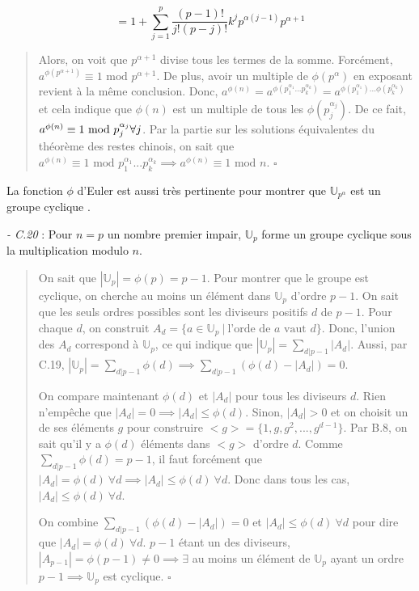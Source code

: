 \begin{equation*}
    = 1 + \sum_{j=1}^{p}\frac{(p-1)!}{j!(p-j)!}k^jp^{\alpha(j-1)}p^{\alpha + 1}
\end{equation*}

\begin{quote}
    Alors, on voit que $p^{\alpha + 1}$ divise tous les termes de la somme. Forcément, $a^{\phi(p^{\alpha + 1})} \equiv 1 \text{ mod } p^{\alpha + 1}$. De plus, avoir un multiple de $\phi(p^\alpha)$ en exposant revient à la même conclusion. Donc, $a^{\phi(n)} = a^{\phi(p_1^{\alpha_1}...p_k^{\alpha_k})} = a^{\phi(p_1^{\alpha_1})...\phi(p_k^{\alpha_k})}$ et cela indique que $\phi(n)$ est un multiple de tous les $\phi(p_j^{\alpha_j})$. De ce fait, $a^{\phi(n)} \equiv 1 \text{ mod } p_j^{\alpha_j} \\ \forall j$. Par la partie sur les solutions équivalentes du théorème des restes chinois, on sait que $a^{\phi(n)} \equiv 1 \text{ mod } p_1^{\alpha_1}...p_k^{\alpha_k} \implies a^{\phi(n)} \equiv 1 \text{ mod } n$. $\square$
\end{quote}

La fonction $\phi$ d'Euler est aussi très pertinente pour montrer que $\mathbb{U}_{p^{\alpha}}$ est un groupe cyclique \cite{key}.

\textit{- C.20} : Pour $n = p$ un nombre premier impair, $\mathbb{U}_p$ forme un groupe cyclique sous la multiplication modulo $n$.

\begin{quote}
    On sait que $|\mathbb{U}_p| = \phi(p) = p-1$. Pour montrer que le groupe est cyclique, on cherche au moins un élément dans $\mathbb{U}_p$ d'ordre $p-1$. On sait que les seuls ordres possibles sont les diviseurs positifs $d$ de $p-1$. Pour chaque $d$, on construit $A_d = \{a \in \mathbb{U}_p \ | \ \text{l'orde de $a$ vaut $d$}\}$. Donc, l'union des $A_d$ correspond à $\mathbb{U}_p$, ce qui indique que $|\mathbb{U}_p| = \sum_{d|p-1}|A_d|$. Aussi, par C.19, $|\mathbb{U}_p| = \sum_{d|p-1}\phi(d) \implies \sum_{d|p-1}^{}\left(\phi(d) - |A_d|\right) = 0$.
    
    On compare maintenant $\phi(d)$ et $|A_d|$ pour tous les diviseurs $d$. Rien n'empêche que $|A_d| = 0 \implies |A_d| \leq \phi(d)$. Sinon, $|A_d| > 0$ et on choisit un de ses éléments $g$ pour construire $<g> = \{1, g, g^2, ..., g^{d-1}\}$. Par B.8, on sait qu'il y a $\phi(d)$ éléments dans $<g>$ d'ordre $d$. Comme $\sum_{d|p-1}^{} \phi(d) = p-1$, il faut forcément que $|A_d| = \phi(d) \ \forall d \implies |A_d| \leq \phi(d) \ \forall d$. Donc dans tous les cas, $|A_d| \leq \phi(d) \ \forall d$.

    On combine $\sum_{d|p-1}^{}\left(\phi(d) - |A_d|\right) = 0$ et $|A_d| \leq \phi(d) \ \forall d$ pour dire que $|A_d| = \phi(d) \ \forall d$. $p-1$ étant un des diviseurs, $|A_{p-1}| = \phi(p-1) \neq 0 \implies \exists$ au moins un élément de $\mathbb{U}_p$ ayant un ordre $p-1 \implies \mathbb{U}_p$ est cyclique. $\square$
\end{quote}

